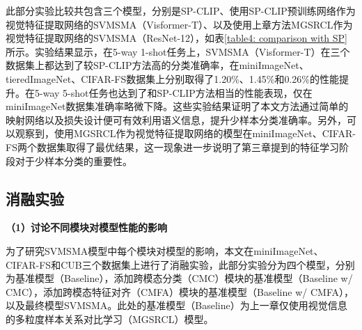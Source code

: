 此部分实验比较共包含三个模型，分别是SP-CLIP、使用SP-CLIP预训练网络作为视觉特征提取网络的SVMSMA（Visformer-T）、以及使用上章方法MGSRCL作为视觉特征提取网络的SVMSMA（ResNet-12），如表\ref{table4: comparison with SP}所示。实验结果显示，在5-way 1-shot任务上，SVMSMA（Visformer-T）在三个数据集上都达到了较SP-CLIP方法高的分类准确率，在miniImageNet、tieredImageNet、CIFAR-FS数据集上分别取得了1.20\%、1.45\%和0.26\%的性能提升。在5-way 5-shot任务也达到了和SP-CLIP方法相当的性能表现，仅在miniImageNet数据集准确率略微下降。这些实验结果证明了本文方法通过简单的映射网络以及损失设计便可有效利用语义信息，提升少样本分类准确率。另外，可以观察到，使用MGSRCL作为视觉特征提取网络的模型在miniImageNet、CIFAR-FS两个数据集取得了最优结果，这一现象进一步说明了第三章提到的特征学习阶段对于少样本分类的重要性。

\subsection[\hspace{-2pt}消融实验]{{\heiti{} \hspace{-8pt}消融实验}}\label{section4: 消融实验}

\textbf{（1）讨论不同模块对模型性能的影响}

为了研究SVMSMA模型中每个模块对模型的影响，本文在miniImageNet、CIFAR-FS和CUB三个数据集上进行了消融实验，此部分实验分为四个模型，分别为基准模型（Baseline），添加跨模态分类（CMC）模块的基准模型（Baseline w/ CMC），添加跨模态特征对齐（CMFA）模块的基准模型（Baseline w/ CMFA），以及最终模型SVMSMA。此处的基准模型（Baseline）为上一章仅使用视觉信息的多粒度样本关系对比学习（MGSRCL）模型。

